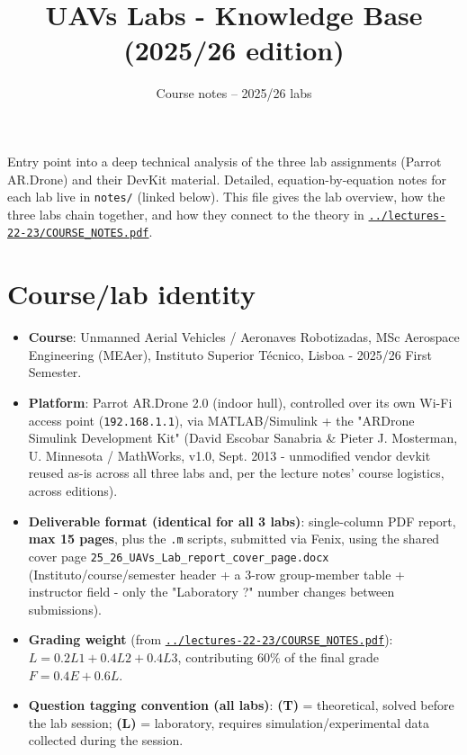 \documentclass[11pt]{article}
\title{UAVs Labs - Knowledge Base (2025/26 edition)}
\author{Course notes -- 2025/26 labs}
\date{}
\begin{document}
\maketitle
\tableofcontents
\vspace{1em}

Entry point into a deep technical analysis of the three lab assignments (Parrot AR.Drone) and their DevKit material.
Detailed, equation-by-equation notes for each lab live in \texttt{notes/} (linked below).
This file gives the lab overview, how the three labs chain together, and how they connect to the theory in \href{../lectures-22-23/COURSE_NOTES.pdf}{\texttt{../lectures-22-23/COURSE\_\allowbreak{}NOTES.pdf}}.

\section{Course/lab identity}

\begin{itemize}
\item \textbf{Course}: Unmanned Aerial Vehicles / Aeronaves Robotizadas, MSc Aerospace Engineering (MEAer), Instituto Superior Técnico, Lisboa - 2025/26 First Semester.
\item \textbf{Platform}: Parrot AR.Drone 2.0 (indoor hull), controlled over its own Wi-Fi access point (\texttt{192.168.1.1}), via MATLAB/Simulink + the "ARDrone Simulink Development Kit" (David Escobar Sanabria \& Pieter J. Mosterman, U. Minnesota / MathWorks, v1.0, Sept. 2013 - unmodified vendor devkit reused as-is across all three labs and, per the lecture notes' course logistics, across editions).
\item \textbf{Deliverable format (identical for all 3 labs)}: single-column PDF report, \textbf{max 15 pages}, plus the \texttt{.m} scripts, submitted via Fenix, using the shared cover page \texttt{25\_\allowbreak{}26\_\allowbreak{}UAVs\_\allowbreak{}Lab\_\allowbreak{}report\_\allowbreak{}cover\_\allowbreak{}page.docx} (Instituto/course/semester header + a 3-row group-member table + instructor field - only the "Laboratory ?" number changes between submissions).
\item \textbf{Grading weight} (from \href{../lectures-22-23/COURSE_NOTES.pdf}{\texttt{../lectures-22-23/COURSE\_\allowbreak{}NOTES.pdf}}): $L = 0.2 L1 + 0.4 L2 + 0.4 L3$, contributing 60\% of the final grade $F = 0.4 E + 0.6 L$.
\item \textbf{Question tagging convention (all labs)}: \textbf{(T)} = theoretical, solved before the lab session; \textbf{(L)} = laboratory, requires simulation/experimental data collected during the session.
\end{itemize}
\end{document}
